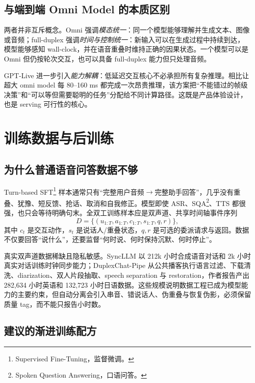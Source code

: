 \documentclass[UTF8,fontset=none,a4paper,10pt]{ctexart}
\begin{document}
\subsection{与端到端 Omni Model 的本质区别}

两者并非互斥概念。Omni 强调\emph{模态统一}：同一个模型能够理解并生成文本、图像或音频；full-duplex 强调\emph{时间与控制统一}：新输入可以在生成过程中持续到达，模型能够感知 wall-clock，并在语音重叠时维持正确的因果状态。一个模型可以是 Omni 但仍按轮次交互，也可以具备 full-duplex 能力但只处理音频。

GPT-Live 进一步引入\emph{能力解耦}：低延迟交互核心不必承担所有复杂推理。相比让超大 omni model 每 80--160 ms 都完成一次昂贵推理，该方案把“不能错过的帧级决策”和“可以等但需要聪明的任务”分配给不同计算路径。这既是产品体验设计，也是 serving 可行性的核心。

\section{训练数据与后训练}

\subsection{为什么普通语音问答数据不够}

Turn-based SFT\footnote{Supervised Fine-Tuning，监督微调。} 样本通常只有“完整用户音频$\to$完整助手回答”，几乎没有重叠、犹豫、短反馈、抢话、取消和自我修正。模型即使 ASR、SQA\footnote{Spoken Question Answering，口语问答。}、TTS 都很强，也只会等待明确句末。全双工训练样本应是双声道、共享时间轴事件序列
\begin{equation}
D=\{(u_{1:T},a_{1:T},c_{1:T},s_{1:T},q,r)\},
\end{equation}
其中 $c_t$ 是交互动作，$s_t$ 是说话人/重叠状态，$q,r$ 是可选的委派请求与返回。数据不仅要回答“说什么”，还要监督“何时说、何时保持沉默、何时停止”。

真实双声道数据稀缺且隐私敏感。SyncLLM 以 212k 小时合成语音对话和 2k 小时真实对话训练时钟同步能力\cite{veluri2024syncllm}；DuplexChat-Pipe 从公共播客执行语言过滤、下载清洗、diarization、双人片段抽取、speech separation 与 restoration，作者报告产出 282,634 小时英语和 132,723 小时日语数据\cite{nakata2026duplexchat}。这些规模说明数据工程已成为模型能力的主要约束，但自动分离会引入串音、错说话人、伪重叠与恢复伪影，必须保留质量 tag，而不能只报告小时数。

\subsection{建议的渐进训练配方}
\end{document}
